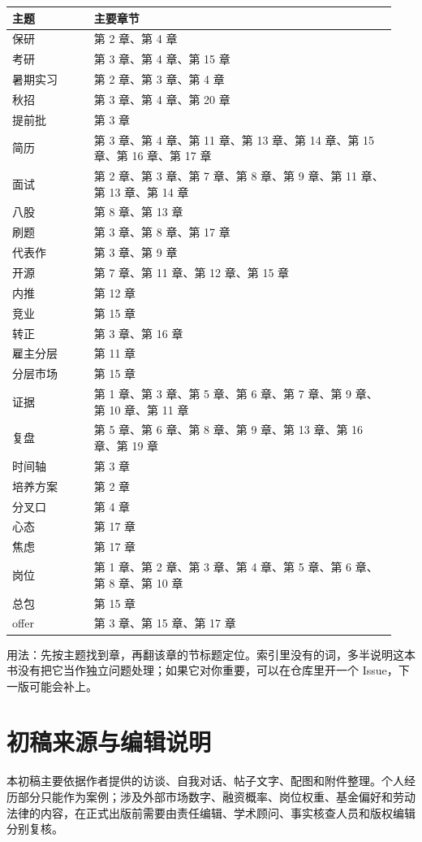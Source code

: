 \documentclass[UTF8,zihao=5,openany]{ctexbook}
\begin{document}
{\small\begin{longtable}{p{0.20\linewidth}p{0.74\linewidth}}
\toprule
主题 & 主要章节 \\
\midrule
保研 & 第 2 章、第 4 章 \\
考研 & 第 3 章、第 4 章、第 15 章 \\
暑期实习 & 第 2 章、第 3 章、第 4 章 \\
秋招 & 第 3 章、第 4 章、第 20 章 \\
提前批 & 第 3 章 \\
简历 & 第 3 章、第 4 章、第 11 章、第 13 章、第 14 章、第 15 章、第 16 章、第 17 章 \\
面试 & 第 2 章、第 3 章、第 7 章、第 8 章、第 9 章、第 11 章、第 13 章、第 14 章 \\
八股 & 第 8 章、第 13 章 \\
刷题 & 第 3 章、第 8 章、第 17 章 \\
代表作 & 第 3 章、第 9 章 \\
开源 & 第 7 章、第 11 章、第 12 章、第 15 章 \\
内推 & 第 12 章 \\
竞业 & 第 15 章 \\
转正 & 第 3 章、第 16 章 \\
雇主分层 & 第 11 章 \\
分层市场 & 第 15 章 \\
证据 & 第 1 章、第 3 章、第 5 章、第 6 章、第 7 章、第 9 章、第 10 章、第 11 章 \\
复盘 & 第 5 章、第 6 章、第 8 章、第 9 章、第 13 章、第 16 章、第 19 章 \\
时间轴 & 第 3 章 \\
培养方案 & 第 2 章 \\
分叉口 & 第 4 章 \\
心态 & 第 17 章 \\
焦虑 & 第 17 章 \\
岗位 & 第 1 章、第 2 章、第 3 章、第 4 章、第 5 章、第 6 章、第 8 章、第 10 章 \\
总包 & 第 15 章 \\
offer & 第 3 章、第 15 章、第 17 章 \\
\bottomrule
\end{longtable}}

用法：先按主题找到章，再翻该章的节标题定位。索引里没有的词，多半说明这本书没有把它当作独立问题处理；如果它对你重要，可以在仓库里开一个 Issue，下一版可能会补上。

\chapter{初稿来源与编辑说明}
本初稿主要依据作者提供的访谈、自我对话、帖子文字、配图和附件整理。个人经历部分只能作为案例；涉及外部市场数字、融资概率、岗位权重、基金偏好和劳动法律的内容，在正式出版前需要由责任编辑、学术顾问、事实核查人员和版权编辑分别复核。
\end{document}
